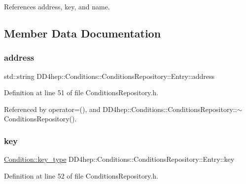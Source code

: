 References address, key, and name.



\subsection{Member Data Documentation}
\hypertarget{class_d_d4hep_1_1_conditions_1_1_conditions_repository_1_1_entry_a6a105e657ab13c08b36b5e0e5be73deb}{}\label{class_d_d4hep_1_1_conditions_1_1_conditions_repository_1_1_entry_a6a105e657ab13c08b36b5e0e5be73deb} 
\subsubsection{\texorpdfstring{address}{address}}
{\footnotesize\ttfamily std\+::string D\+D4hep\+::\+Conditions\+::\+Conditions\+Repository\+::\+Entry\+::address}



Definition at line 51 of file Conditions\+Repository.\+h.



Referenced by operator=(), and D\+D4hep\+::\+Conditions\+::\+Conditions\+Repository\+::$\sim$\+Conditions\+Repository().

\hypertarget{class_d_d4hep_1_1_conditions_1_1_conditions_repository_1_1_entry_a2dff42077683b05077ecebdd3f4e1e0d}{}\label{class_d_d4hep_1_1_conditions_1_1_conditions_repository_1_1_entry_a2dff42077683b05077ecebdd3f4e1e0d} 
\subsubsection{\texorpdfstring{key}{key}}
{\footnotesize\ttfamily \hyperlink{class_d_d4hep_1_1_conditions_1_1_condition_a7528efa762e8cc072ef80ea67c3531f9}{Condition\+::key\+\_\+type} D\+D4hep\+::\+Conditions\+::\+Conditions\+Repository\+::\+Entry\+::key}



Definition at line 52 of file Conditions\+Repository.\+h.




